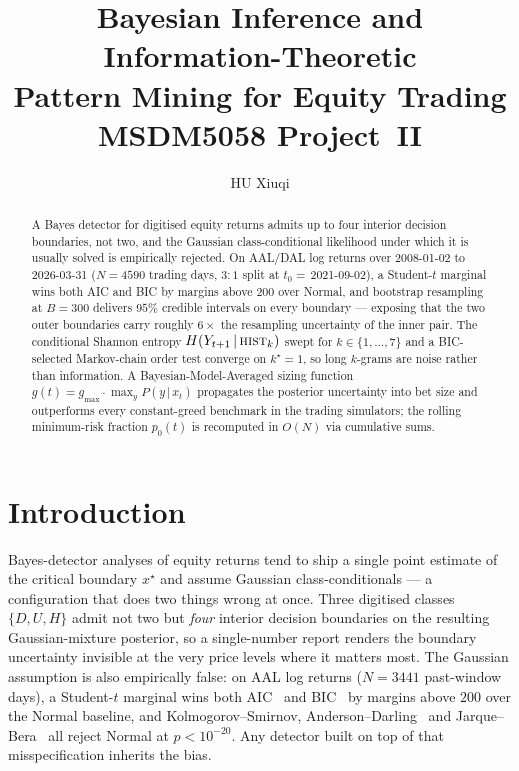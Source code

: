 \documentclass[runningheads]{llncs}
\title{Bayesian Inference and Information-Theoretic\\
Pattern Mining for Equity Trading\\
\vspace{0.4em}
\large MSDM5058 Project~II}
\author{HU Xiuqi}
\institute{HKUST -- Information Science MSc Programme\\
MSDM5058 Information Science -- Spring 2026\\
\email{xhuca@connect.ust.hk}}
\begin{document}
\maketitle
\thispagestyle{empty}
\newpage

\begin{abstract}
A Bayes detector for digitised equity returns admits up to four interior
decision boundaries, not two, and the Gaussian class-conditional
likelihood under which it is usually solved is empirically rejected.
On AAL/DAL log returns over 2008-01-02 to 2026-03-31 ($N{=}\num{4590}$
trading days, $3{:}1$ split at $t_{0}{=}\,$2021-09-02), a Student-$t$
marginal wins both AIC and BIC by margins above $200$ over Normal,
and bootstrap resampling at $B{=}\num{300}$ delivers $95\%$ credible
intervals on every boundary --- exposing that the two outer boundaries
carry roughly $6\!\times$ the resampling uncertainty of the inner pair.
The conditional Shannon entropy
$H(Y_{t+1}\,|\,\textsc{hist}_{k})$ swept for $k\in\{1,\dots,7\}$ and a
BIC-selected Markov-chain order test converge on $k^{\star}{=}1$, so
long $k$-grams are noise rather than information. A
Bayesian-Model-Averaged sizing function
$g(t){=}g_{\max}\!\cdot\!\max_{y}P(y\,|\,x_t)$ propagates the posterior
uncertainty into bet size and outperforms every constant-greed
benchmark in the trading simulators; the rolling minimum-risk
fraction $p_{0}(t)$ is recomputed in $O(N)$ via cumulative sums.
\end{abstract}
\newpage

\tableofcontents
\newpage

\section{Introduction}\label{sec:intro}
Bayes-detector analyses of equity returns tend to ship a single point
estimate of the critical boundary $x^{\star}$ and assume Gaussian
class-conditionals --- a configuration that does two things wrong at
once. Three digitised classes $\{D,U,H\}$ admit not two but
\emph{four} interior decision boundaries on the resulting
Gaussian-mixture posterior, so a single-number report renders the
boundary uncertainty invisible at the very price levels where it
matters most. The Gaussian assumption is also empirically false: on
AAL log returns ($N{=}\num{3441}$ past-window days), a Student-$t$
marginal wins both AIC~\cite{akaike1974} and BIC~\cite{schwarz1978}
by margins above $200$ over the Normal baseline, and Kolmogorov--Smirnov,
Anderson--Darling~\cite{andersondarling1954} and
Jarque--Bera~\cite{jarquebera1987} all reject Normal at
$p<10^{-20}$. Any detector built on top of that misspecification
inherits the bias.
\end{document}
